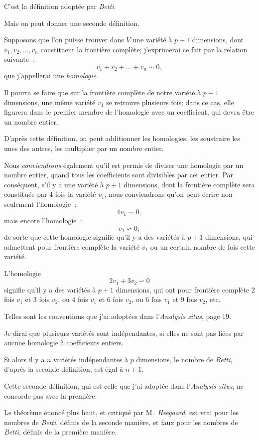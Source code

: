 \documentclass{article}
\begin{document}
C'est la définition adoptée par \emph{Betti}.

Mais on peut donner une seconde définition.

Supposons que l'on puisse trouver dans $V$ une variété à $p+1$ dimensions, dont $v_{1}, v_{2}, \ldots, v_{n}$ constituent la frontière complète; j'exprimerai ce fait par la relation suivante~:
\[ v_{1} + v_{2} + \ldots + v_{n} \backsim 0, \]
que j'appellerai une \emph{homologie}.

Il pourra se faire que sur la frontière complète de notre variété à $p+1$ dimensions, une même variété $v_{1}$ se retrouve plusieurs fois; dans ce cas, elle figurera dans le premier membre de l'homologie avec un coefficient, qui devra être un nombre entier.

D'après cette définition, on peut additionner les homologies, les soustraire les unes des autres, les multiplier par un nombre entier.

Nous \emph{conviendrons} également qu'il est permis de diviser une homologie par un nombre entier, quand tous les coefficients sont divisibles par cet entier. Par conséquent, s'il y a une variété à $p+1$ dimensions, dont la frontière complète sera constituée par 4 fois la variété $v_{1}$, nous conviendrons qu'on peut écrire non seulement l'homologie~:
\[ 4v_{1} \backsim 0, \]
mais encore l'homologie~:
\[ v_{1} \backsim 0; \]
de sorte que cette homologie signifie qu'il y a des variétés à $p+1$ dimensions, qui admettent pour frontière complète la variété $v_{1}$ ou un certain nombre de fois cette variété.

L'homologie
\[ 2v_{1} + 3v_{2} \backsim 0 \]
signifie qu'il y a des variétés à $p+1$ dimensions, qui ont pour frontière complète 2 fois $v_{1}$ et 3 fois $v_{2}$, ou 4 fois $v_{1}$ et 6 fois $v_{2}$, ou 6 fois $v_{1}$ et 9 fois $v_{2}$, etc.

Telles sont les conventions que j'ai adoptées dans l'\emph{Analysis situs}, page 19.

Je dirai que plusieurs variétés sont indépendantes, si elles ne sont pas liées par aucune homologie à coefficients entiers.

Si alors il y a $n$ variétés indépendantes à $p$ dimensions, le nombre de \emph{Betti}, d'après la seconde définition, est égal à $n+1$.

Cette seconde définition, qui est celle que j'ai adoptée dans l'\emph{Analysis situs}, ne concorde pas avec la première.

Le théorème énoncé plus haut, et critiqué par M.~\emph{Heegaard}, est vrai pour les nombres de \emph{Betti}, définis de la seconde manière, et faux pour les nombres de \emph{Betti}, définis de la première manière.
\end{document}
